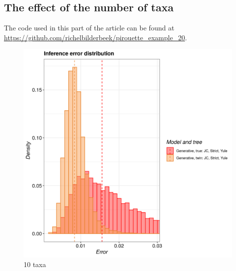\subsection{The effect of the number of taxa}

The code used in this part of the article can be found at 
\url{https://github.com/richelbilderbeek/pirouette_example_20}. 

\begin{figure}[H]
  \includegraphics[width=\textwidth]{pirouette_example_20/example_20_314/errors.png}
  \caption{10 taxa}
\end{figure}

